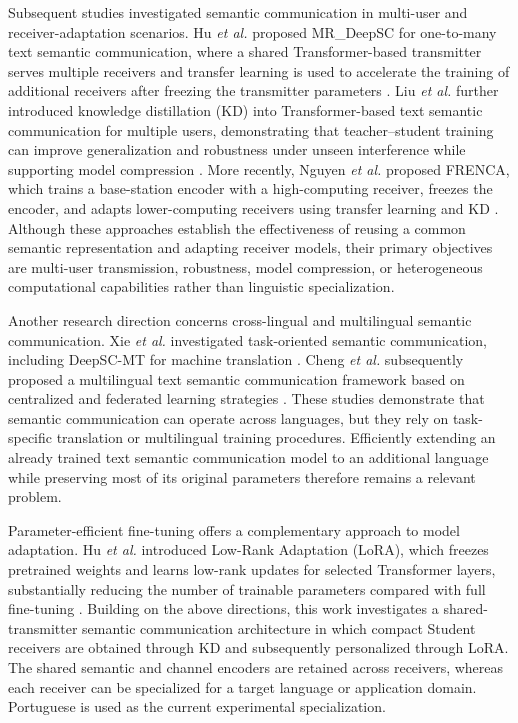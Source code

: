 \documentclass[conference]{IEEEtran}
\begin{document}
Subsequent studies investigated semantic communication in multi-user and receiver-adaptation scenarios. Hu \textit{et al.} proposed MR\_DeepSC for one-to-many text semantic communication, where a shared Transformer-based transmitter serves multiple receivers and transfer learning is used to accelerate the training of additional receivers after freezing the transmitter parameters \cite{hu2022onetomany}. Liu \textit{et al.} further introduced knowledge distillation (KD) into Transformer-based text semantic communication for multiple users, demonstrating that teacher--student training can improve generalization and robustness under unseen interference while supporting model compression \cite{liu2024kdsemcom}. More recently, Nguyen \textit{et al.} proposed FRENCA, which trains a base-station encoder with a high-computing receiver, freezes the encoder, and adapts lower-computing receivers using transfer learning and KD \cite{nguyen2025optimizing}. Although these approaches establish the effectiveness of reusing a common semantic representation and adapting receiver models, their primary objectives are multi-user transmission, robustness, model compression, or heterogeneous computational capabilities rather than linguistic specialization.

Another research direction concerns cross-lingual and multilingual semantic communication. Xie \textit{et al.} investigated task-oriented semantic communication, including DeepSC-MT for machine translation \cite{xie2022task}. Cheng \textit{et al.} subsequently proposed a multilingual text semantic communication framework based on centralized and federated learning strategies \cite{cheng2025multilingual}. These studies demonstrate that semantic communication can operate across languages, but they rely on task-specific translation or multilingual training procedures. Efficiently extending an already trained text semantic communication model to an additional language while preserving most of its original parameters therefore remains a relevant problem.

Parameter-efficient fine-tuning offers a complementary approach to model adaptation. Hu \textit{et al.} introduced Low-Rank Adaptation (LoRA), which freezes pretrained weights and learns low-rank updates for selected Transformer layers, substantially reducing the number of trainable parameters compared with full fine-tuning \cite{hu2022lora}. Building on the above directions, this work investigates a shared-transmitter semantic communication architecture in which compact Student receivers are obtained through KD and subsequently personalized through LoRA. The shared semantic and channel encoders are retained across receivers, whereas each receiver can be specialized for a target language or application domain. Portuguese is used as the current experimental specialization.
\end{document}
